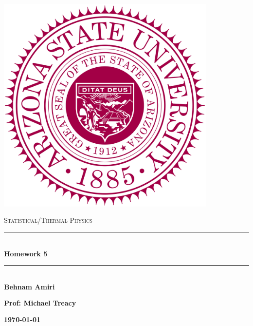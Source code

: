 \documentclass[fleqn]{article}
\begin{document}
  \begin{titlepage}

    \newcommand{\HRule}{\rule{\linewidth}{0.5mm}}

    \center

    \begin{center}
      \includegraphics[height=11cm, width=11cm]{asu.png}
    \end{center}

    \vline

    \textsc{\LARGE Statistical/Thermal Physics}\\[1.5cm]

    \HRule \\[0.5cm]
    { \huge \bfseries Homework 5}\\[0.4cm] 
    \HRule \\[1.0cm]

    \textbf{Behnam Amiri}

    \bigbreak

    \textbf{Prof: Michael Treacy}

    \bigbreak

    \textbf{{\large \today}\\[2cm]}

    \vfill

  \end{titlepage}
\end{document}
